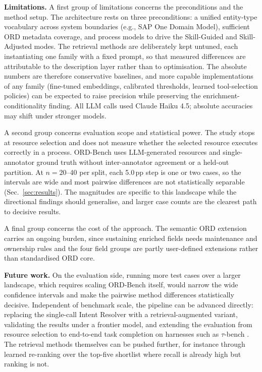 \documentclass[10pt,twocolumn]{article}
\begin{document}
\textbf{Limitations.} A first group of limitations concerns the preconditions and the method setup. The architecture rests on three preconditions: a unified entity-type vocabulary across system boundaries (e.g., SAP One Domain Model), sufficient ORD metadata coverage, and process models to drive the Skill-Guided and Skill-Adjusted modes. The retrieval methods are deliberately kept untuned, each instantiating one family with a fixed prompt, so that measured differences are attributable to the description layer rather than to optimisation. The absolute numbers are therefore conservative baselines, and more capable implementations of any family (fine-tuned embeddings, calibrated thresholds, learned tool-selection policies) can be expected to raise precision while preserving the enrichment-conditionality finding. All LLM calls used Claude Haiku 4.5; absolute accuracies may shift under stronger models.

A second group concerns evaluation scope and statistical power. The study stops at resource selection and does not measure whether the selected resource executes correctly in a process. ORD-Bench uses LLM-generated resources and single-annotator ground truth without inter-annotator agreement or a held-out partition. At $n{=}20$--40 per split, each 5.0\,pp step is one or two cases, so the intervals are wide and most pairwise differences are not statistically separable (Sec.~\ref{sec:results}). The magnitudes are specific to this landscape while the directional findings should generalise, and larger case counts are the clearest path to decisive results.

A final group concerns the cost of the approach. The semantic ORD extension carries an ongoing burden, since sustaining enriched fields needs maintenance and ownership rules and the four field groups are partly user-defined extensions rather than standardised ORD core.

\textbf{Future work.} On the evaluation side, running more test cases over a larger landscape, which requires scaling ORD-Bench itself, would narrow the wide confidence intervals and make the pairwise method differences statistically decisive. Independent of benchmark scale, the pipeline can be advanced directly: replacing the single-call Intent Resolver with a retrieval-augmented variant, validating the results under a frontier model, and extending the evaluation from resource selection to end-to-end task completion on harnesses such as $\tau$-bench \citep{yao_tau-bench_2024}. The retrieval methods themselves can be pushed further, for instance through learned re-ranking over the top-five shortlist where recall is already high but ranking is not.
\end{document}
